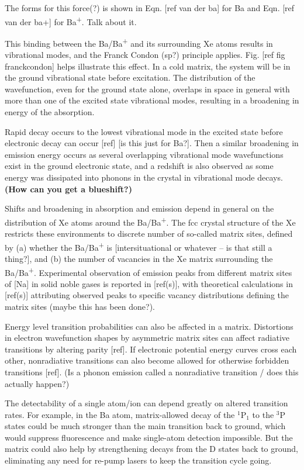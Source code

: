 The forms for this force(?) is shown in Eqn. [ref van der ba] for Ba and Eqn. [ref van der ba+] for Ba\textsuperscript{+}.  {\color{gray}Talk about it.}

This binding between the Ba/Ba\textsuperscript{+} and its surrounding Xe atoms results in vibrational modes, and the Franck Condon (sp?) principle applies.  Fig. [ref fig franckcondon] helps illustrate this effect.  In a cold matrix, the system will be in the ground vibrational state before excitation.  The distribution of the wavefunction, even for the ground state alone, overlaps in space in general with more than one of the excited state vibrational modes, resulting in a broadening in energy of the absorption.

Rapid decay occurs to the lowest vibrational mode in the excited state before electronic decay can occur [ref] {\color{red}[is this just for Ba?]}.  Then a similar broadening in emission energy occurs as several overlapping vibrational mode wavefunctions exist in the ground electronic state, and a redshift is also observed as some energy was dissipated into phonons in the crystal in vibrational mode decays.  {\color{blue}\textbf{(How can you get a blueshift?)}}

Shifts and broadening in absorption and emission depend in general on the distribution of Xe atoms around the Ba/Ba\textsuperscript{+}.  The fcc crystal structure of the Xe restricts these environments to discrete number of so-called matrix sites, defined by (a) whether the Ba/Ba\textsuperscript{+} is {\color{red}[intersituational or whatever -- is that still a thing?]}, and (b) the number of vacancies in the Xe matrix surrounding the Ba/Ba\textsuperscript{+}.  Experimental observation of emission peaks from different matrix sites of [Na] in solid noble gases is reported in [ref(s)], with theoretical calculations in [ref(s)] attributing observed peaks to specific vacancy distributions defining the matrix sites (maybe this has been done?).

Energy level transition probabilities can also be affected in a matrix.  Distortions in electron wavefunction shapes by asymmetric matrix sites can affect radiative transitions by altering parity [ref].  If electronic potential energy curves cross each other, nonradiative transitions can also become allowed for otherwise forbidden transitions [ref].  {\color{red}(Is a phonon emission called a nonradiative transition / does this actually happen?)}

The detectability of a single atom/ion can depend greatly on altered transition rates.  For example, in the Ba atom, matrix-allowed decay of the $^{1}$P$_{1}$ to the $^{3}$P states could be much stronger than the main transition back to ground, which would suppress fluorescence and make single-atom detection impossible.  But the matrix could also help by strengthening decays from the D states back to ground, eliminating any need for re-pump lasers to keep the transition cycle going.  